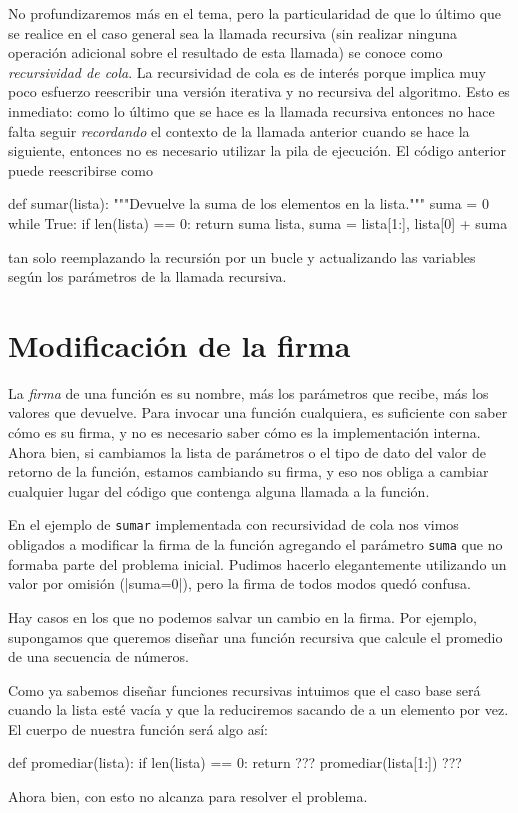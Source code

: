 No profundizaremos más en el tema, pero la particularidad de que lo último
que se realice en el caso general sea la llamada recursiva (sin realizar
ninguna operación adicional sobre el resultado de esta llamada) se conoce como
\emph{recursividad de cola}. La recursividad de cola es de interés porque
implica muy poco esfuerzo reescribir una versión iterativa y no recursiva
del algoritmo. Esto es inmediato: como lo último que se hace es la llamada
recursiva entonces no hace falta seguir \emph{recordando} el contexto de la
llamada anterior cuando se hace la siguiente, entonces no es necesario utilizar
la pila de ejecución. El código anterior puede reescribirse como
\begin{codigo-python-sn}
def sumar(lista):
    """Devuelve la suma de los elementos en la lista."""
    suma = 0
    while True:
        if len(lista) == 0:
            return suma
        lista, suma = lista[1:], lista[0] + suma
\end{codigo-python-sn}
tan solo reemplazando la recursión por un bucle y actualizando las
variables según los parámetros de la llamada recursiva.

\section{Modificación de la firma}

La \emph{firma} de una función es su nombre, más los
parámetros que recibe, más los valores que devuelve. Para invocar una función
cualquiera, es suficiente con saber cómo es su firma, y no es necesario saber
cómo es la implementación interna. Ahora bien, si cambiamos la lista
de parámetros o el tipo de dato del valor de retorno de la función, estamos
cambiando su firma, y eso nos obliga a cambiar cualquier lugar del código
que contenga alguna llamada a la función.

En el ejemplo de \lstinline!sumar! implementada con recursividad de cola nos
vimos obligados a modificar la firma de la función agregando el parámetro
\lstinline!suma! que no formaba parte del problema inicial. Pudimos hacerlo
elegantemente utilizando un valor por omisión (|suma=0|), pero la firma de
todos modos quedó confusa.

Hay casos en los que no podemos salvar un cambio en la firma.  Por ejemplo,
supongamos que queremos diseñar una función recursiva que calcule el promedio
de una secuencia de números.

Como ya sabemos diseñar funciones recursivas intuimos que el caso base será
cuando la lista esté vacía y que la reduciremos sacando de a un elemento por
vez. El cuerpo de nuestra función será algo así:
\begin{codigo-python-sn}
def promediar(lista):
    if len(lista) == 0:
        return ???
    promediar(lista[1:]) ???
\end{codigo-python-sn}
Ahora bien, con esto no alcanza para resolver el problema.

